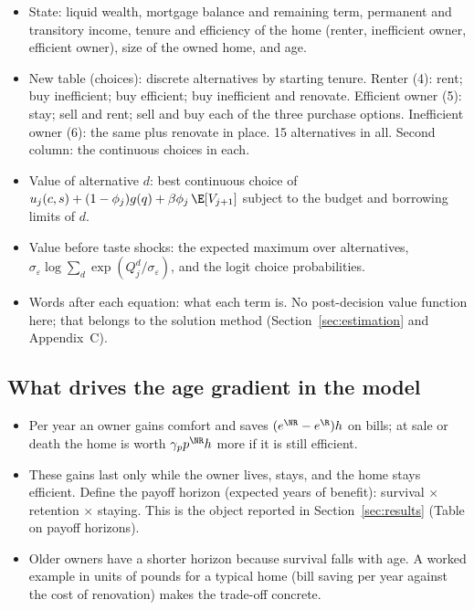 \begin{itemize}
  \item State: liquid wealth, mortgage balance and remaining term,
    permanent and transitory income, tenure and efficiency of the home
    (renter, inefficient owner, efficient owner), size of the owned home,
    and age.
  \item New table (choices): discrete alternatives by starting tenure.
    Renter (4): rent; buy inefficient; buy efficient; buy inefficient and
    renovate. Efficient owner (5): stay; sell and rent; sell and buy each
    of the three purchase options. Inefficient owner (6): the same plus
    renovate in place. 15 alternatives in all. Second column: the
    continuous choices in each.
\end{itemize}

\begin{itemize}
  \item Value of alternative $d$: best continuous choice of
    $u_j(c,s)+(1-\phi_j)g(q)+\beta\phi_j\,\E[V_{j+1}]$ subject to the
    budget and borrowing limits of $d$.
  \item Value before taste shocks: the expected maximum over alternatives,
    $\sigma_\varepsilon\log\sum_d\exp(Q^d_j/\sigma_\varepsilon)$, and the
    logit choice probabilities.
  \item Words after each equation: what each term is. No post-decision
    value function here; that belongs to the solution method
    (Section~\ref{sec:estimation} and Appendix~C).
\end{itemize}

\subsection{What drives the age gradient in the model}

\begin{itemize}
  \item Per year an owner gains comfort and saves
    $(e^{\NR}-e^{\R})h$ on bills; at sale or death the home is worth
    $\gamma_p p^{\NR} h$ more if it is still efficient.
  \item These gains last only while the owner lives, stays, and the home
    stays efficient. Define the payoff horizon (expected years of benefit):
    survival $\times$ retention $\times$ staying. This is the object
    reported in Section~\ref{sec:results} (Table on payoff horizons).
  \item Older owners have a shorter horizon because survival falls with
    age. A worked example in units of pounds for a typical home (bill
    saving per year against the cost of renovation) makes the trade-off
    concrete. 
\end{itemize}

